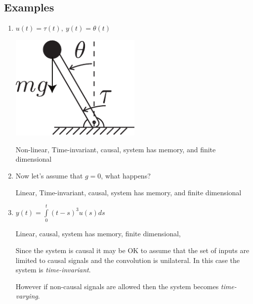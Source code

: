 \documentclass[12pt,oneside]{amsart}
\begin{document}
\subsection{Examples}

\begin{enumerate}

\item 

  \begin{minipage}[h]{0.5\linewidth}
      $u(t) = \tau(t) , \ y(t) = \theta(t)$
  \end{minipage}
  \begin{minipage}[h]{0.5\linewidth}
    \begin{center}
      \includegraphics[width=0.5\textwidth]{pendulum}
    \end{center}
  \end{minipage}

\vspace{6pt}

Non-linear, Time-invariant, causal, system has memory, and finite dimensional

\vspace{6pt}

\item  Now let's assume that $g = 0$, what happens?

\vspace{6pt}

Linear, Time-invariant, causal, system has memory, and finite dimensional

\vspace{6pt}

\item $y(t) = \int\limits_{0}^{t} (t-s)^3 u(s) ds$

\vspace{6pt}

Linear, causal, system has memory, finite dimensional,

Since the system is causal it may be OK to assume that the set of
inputs are limited to causal signals and the convolution is unilateral.
In this case the system is \textit{time-invariant}.

\vspace{6pt}

However if non-causal signals are allowed then the system becomes
\textit{time-varying}. 

\end{enumerate}
\end{document}
